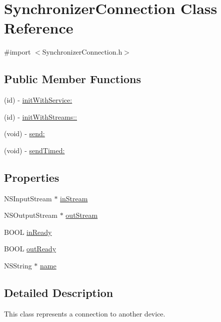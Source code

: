 \hypertarget{interface_synchronizer_connection}{
\section{SynchronizerConnection Class Reference}
\label{interface_synchronizer_connection}
}


{\ttfamily \#import $<$SynchronizerConnection.h$>$}

\subsection*{Public Member Functions}
\begin{DoxyCompactItemize}
\item 
(id) -\/ \hyperlink{interface_synchronizer_connection_a85d039f4fe918b4ab91b90c1bac883f1}{initWithService:}
\item 
(id) -\/ \hyperlink{interface_synchronizer_connection_a97b996ff087bec3e20030ea7a28ae97c}{initWithStreams::}
\item 
(void) -\/ \hyperlink{interface_synchronizer_connection_a939a6f91cc8242331d9667962c0bee25}{send:}
\item 
(void) -\/ \hyperlink{interface_synchronizer_connection_ab99a267a91e1318c7cbb20a5b70ea644}{sendTimed:}
\end{DoxyCompactItemize}
\subsection*{Properties}
\begin{DoxyCompactItemize}
\item 
NSInputStream $\ast$ \hyperlink{interface_synchronizer_connection_a6518f57e11a87d0fa1592f43e6c09ef6}{inStream}
\item 
NSOutputStream $\ast$ \hyperlink{interface_synchronizer_connection_a40bb251ce886c4b07fe1c1e4c5107eeb}{outStream}
\item 
BOOL \hyperlink{interface_synchronizer_connection_af9691c42e72c2c15aee4012b5de79aae}{inReady}
\item 
BOOL \hyperlink{interface_synchronizer_connection_a64d91b9747d4876f20415079bb9d9f7f}{outReady}
\item 
NSString $\ast$ \hyperlink{interface_synchronizer_connection_a4b93d352d2fca75b34e1b5a50e03f587}{name}
\end{DoxyCompactItemize}


\subsection{Detailed Description}
This class represents a connection to another device.


